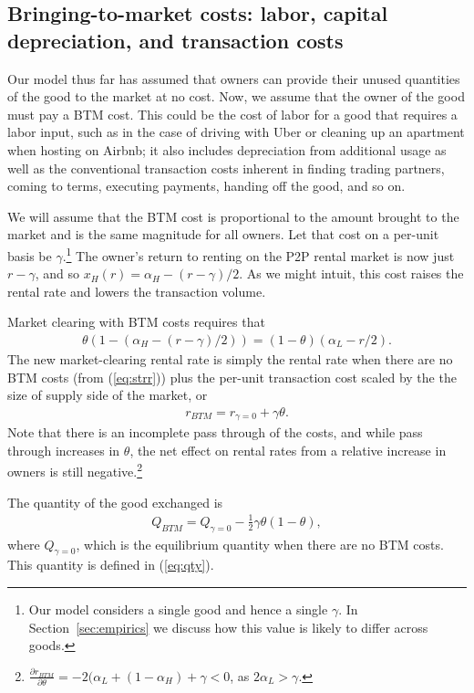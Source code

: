 \documentclass[11pt]{article}
\begin{document}
\subsection{Bringing-to-market costs: labor, capital depreciation, and transaction costs}

Our model thus far has assumed that owners can provide their unused quantities of the good to the market at no cost. 
Now, we assume that the owner of the good must pay a BTM cost. 
This could be the cost of labor for a good that requires a labor input, such as in the case of driving with Uber or cleaning up an apartment when hosting on Airbnb;
it also includes depreciation from additional usage as well as the conventional transaction costs inherent in finding trading partners, coming to terms, executing payments, handing off the good, and so on.  

We will assume that the BTM cost is proportional to the amount brought to the market and is the same magnitude for all owners.
Let that cost on a per-unit basis be $\gamma$.\footnote{
  Our model considers a single good and hence a single $\gamma$.
  In Section~\ref{sec:empirics} we discuss how this value is likely to differ across goods. 
  }
The owner's return to renting on the P2P rental market is now just $r - \gamma$, and so $x_H(r) = \alpha_H - (r - \gamma)/2$.
As we might intuit, this cost raises the rental rate and lowers the transaction volume. 

Market clearing with BTM costs requires that 
\begin{align}
  \theta (1 - (\alpha_H - (r-\gamma)/2)) = (1-\theta)(\alpha_L - r/2).
\end{align}
The new market-clearing rental rate is simply the rental rate when there are no BTM costs (from (\ref{eq:strr})) plus the per-unit transaction cost scaled by the the size of supply side of the market, or  
\begin{align} \label{eq:rental_rate_sr_bmc}
  r_{BTM} = r_{\gamma = 0} + \gamma \theta. 
\end{align}
Note that there is an incomplete pass through of the costs, and while pass through increases in $\theta$, the net effect on rental rates from a relative increase in owners is still negative.\footnote{
  $\frac{\partial r_{BTM}}{\partial \theta} = -2(\alpha_L + (1-\alpha_H) + \gamma < 0$, as $2\alpha_L > \gamma$.}

The quantity of the good exchanged is
\begin{align} \label{eq:qty_gamma}
  Q_{BTM} = Q_{\gamma = 0} - \frac{1}{2} \gamma \theta (1-\theta),
\end{align} 
where $Q_{\gamma = 0}$, which is the equilibrium quantity when there are no BTM costs.
This quantity is defined in (\ref{eq:qty}). 
\end{document}
